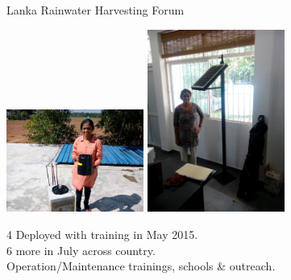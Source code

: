 \documentclass[xcolor=dvipsnames,beamer,unknownkeysallowed]{beamer} %
\begin{document}
\begin{frame}[fragile]{Lanka Rainwater Harvesting Forum}
\begin{center}
 \includegraphics[width=4.5cm]{tanuja1}
  \hspace{5mm}
 \includegraphics[width=4.5cm]{tanuja2}\\
\end{center}

\begin{center}
4 Deployed with training in May 2015. \\
6 more in July across country.\\
Operation/Maintenance trainings, schools \& outreach.
\end{center}

\end{frame}
\end{document}
